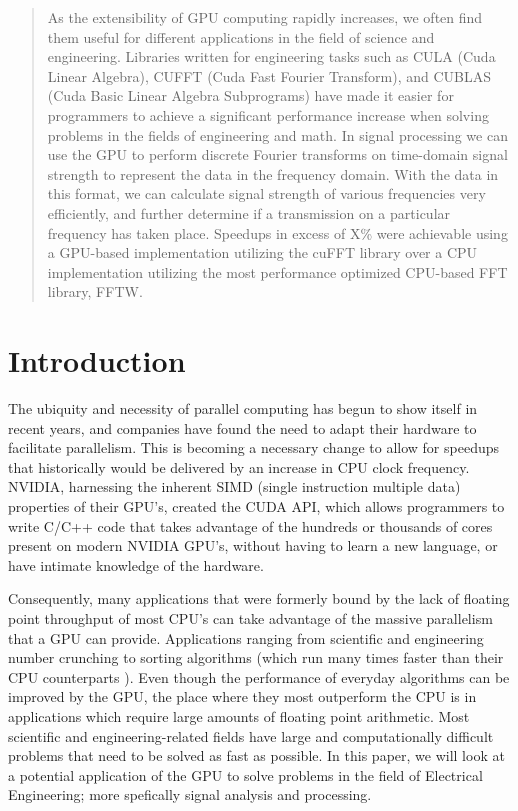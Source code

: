 \documentclass[conference]{IEEEtran}
\begin{document}
\maketitle


\begin{abstract}


As the extensibility of GPU computing rapidly increases, we often find them useful
 for different applications in the field of science and engineering. Libraries
 written for engineering tasks such as CULA (Cuda Linear Algebra), CUFFT (Cuda 
 Fast Fourier Transform), and CUBLAS (Cuda Basic Linear Algebra Subprograms) have
 made it easier for programmers to achieve a significant performance increase when
 solving problems in the fields of engineering and math. In signal processing we can
 use the GPU to perform discrete Fourier transforms on time-domain signal strength
 to represent the data in the frequency domain. With the data in this format, we can 
 calculate signal strength of various frequencies very efficiently, and further determine
 if a transmission on a particular frequency has taken place. Speedups in excess of X\%
 were achievable using a GPU-based implementation utilizing the cuFFT library over a CPU
 implementation utilizing the most performance optimized CPU-based FFT library, FFTW.

\end{abstract}

\IEEEpeerreviewmaketitle

\section{Introduction}

The ubiquity and necessity of parallel computing has begun to show itself
in recent years, and companies have found the need to adapt their hardware to
facilitate parallelism. This is becoming a necessary change to allow for
speedups that historically would be delivered by an increase in CPU clock
frequency. NVIDIA, harnessing the inherent SIMD (single instruction multiple data)
properties of their GPU's, created the CUDA API, which allows programmers
to write C/C++ code that takes advantage of the hundreds or thousands of 
cores present on modern NVIDIA GPU's, without having to learn a new language,
or have intimate knowledge of the hardware. 

Consequently, many applications that were formerly bound by the lack of floating
point throughput of most CPU's can take advantage of the massive parallelism
that a GPU can provide. Applications ranging from scientific and engineering 
number crunching to sorting algorithms (which run many times faster than their
CPU counterparts \cite{x}). Even though the performance of everyday algorithms
can be improved by the GPU, the place where they most outperform the CPU is 
in applications which require large amounts of floating point arithmetic. 
Most scientific and engineering-related fields have large and computationally
difficult problems that need to be solved as fast as possible. In this paper,
we will look at a potential application of the GPU to solve problems in the
field of Electrical Engineering; more spefically signal analysis and processing.
\end{document}
